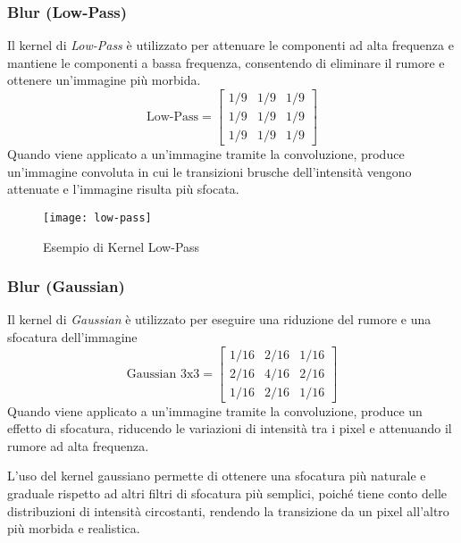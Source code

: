 \subsubsection{Blur (Low-Pass)}
Il kernel di \textit{Low-Pass} è utilizzato per attenuare le componenti ad alta frequenza e mantiene le componenti a bassa frequenza, consentendo di eliminare il rumore e ottenere un'immagine più morbida.\newline
\begin{equation*}
	\text {Low-Pass} = 
	\begin{bmatrix}
		1/9 & 1/9 & 1/9 \\
		1/9 & 1/9 & 1/9 \\
		1/9 & 1/9 & 1/9
	\end{bmatrix}
\end{equation*}
\newline Quando viene applicato a un'immagine tramite la convoluzione, produce un'immagine convoluta in cui le transizioni brusche dell'intensità vengono attenuate e l'immagine risulta più sfocata.
\begin{figure}[H]
	\centering
	\texttt{[image: low-pass]}
	\caption{Esempio di Kernel Low-Pass}
\end{figure}

\subsubsection{Blur (Gaussian)}
Il kernel di \textit{Gaussian} è utilizzato per eseguire una riduzione del rumore e una sfocatura dell'immagine\newline
\begin{equation*}
	\text {Gaussian 3x3} = 
	\begin{bmatrix}
		1/16 & 2/16 & 1/16 \\
		2/16 & 4/16 & 2/16 \\
		1/16 & 2/16 & 1/16
	\end{bmatrix}
\end{equation*}
\newline Quando viene applicato a un'immagine tramite la convoluzione, produce un effetto di sfocatura, riducendo le variazioni di intensità tra i pixel e attenuando il rumore ad alta frequenza.

L'uso del kernel gaussiano permette di ottenere una sfocatura più naturale e graduale rispetto ad altri filtri di sfocatura più semplici, poiché tiene conto delle distribuzioni di intensità circostanti, rendendo la transizione da un pixel all'altro più morbida e realistica.


